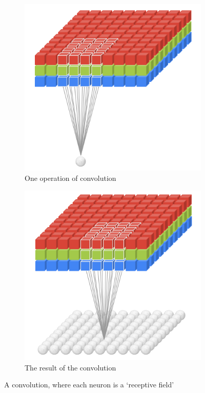 \begin{figure}[H]
\begin{subfigure}[t]{.5\textwidth}
  \vskip 0pt
  \centering
  \includegraphics[width=.8\linewidth]{Images/conv1.png}
  \caption{One operation of convolution}
\end{subfigure}
\begin{subfigure}[t]{.5\textwidth}
  \vskip 0pt 
  \centering
  \includegraphics[width=.8\linewidth]{Images/conv2.png}
  \caption{The result of the convolution}
\end{subfigure}
\caption{A convolution, where each neuron is a `receptive field' \cite{gorner}}
\label{convolution}
\end{figure}

